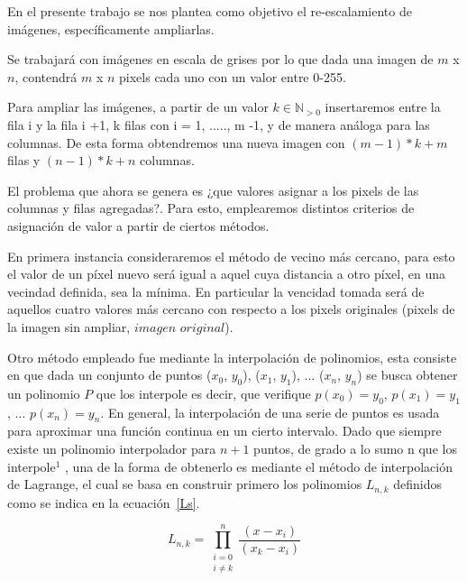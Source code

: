 \documentclass[a4paper]{article}
\newcounter{col}
\begin{document}
En el presente trabajo se nos plantea como objetivo el re-escalamiento de imágenes, específicamente ampliarlas.

Se trabajar\'a con imágenes en escala de grises por lo que dada una imagen de $m$ x $n$, contendrá $m$ x $n$ pixels cada uno con un valor entre 0-255.

Para ampliar las imágenes, a partir de un valor $k \in \mathbb{N}_{>0}$ insertaremos entre la fila i y la fila i +1, k filas con i = 1, ....., m -1, y de manera análoga para las columnas. De esta forma obtendremos una nueva imagen con $(m -1)*k + m$ filas y $(n -1)*k + n$ columnas.

El problema que ahora se genera es ¿que valores asignar a los pixels de las columnas y filas agregadas?. Para esto, emplearemos distintos criterios de asignación de valor a partir de ciertos métodos.

En primera instancia consideraremos el método de vecino m\'as cercano, para esto el valor de un píxel nuevo será igual a aquel cuya distancia a otro píxel, en una vecindad definida, sea la mínima. En particular la vencidad tomada será de aquellos cuatro valores más cercano con respecto a los pixels originales (pixels de la imagen sin ampliar, $imagen$ $original$). 

Otro método empleado fue mediante la interpolación de polinomios, esta consiste en que dada un conjunto de puntos ($ x_{0} $, $ y_{0} $), ($ x_{1} $, $ y_{1} $), $ \ldots $ ($ x_{n} $, $ y_{n} $) se busca obtener un polinomio $P$ que los interpole es decir, que verifique $ p(x_{0}) =  y_{0} $, $ p(x_{1}) =  y_{1} $, $ \ldots $ $ p(x_{n}) =  y_{n} $. En general, la interpolación de una serie de puntos es usada para aproximar una función continua en un cierto intervalo. 
Dado que siempre existe un polinomio interpolador para $n+1$ puntos, de grado a lo sumo n que los interpole$^{1}$ %
, una de la forma de obtenerlo es mediante el método de interpolación de Lagrange, el cual se basa en construir primero los polinomios $ L_{n,k} $ definidos como se indica en la ecuación~\ref{Ls}.

\begin{equation}
L_{n,k}= \prod_{\substack{i=0\\i\neq k}}^{n} \frac{(x-x_{i})}{(x_{k}-x_{i})}
\label{Ls}
\end{equation}
\end{document}
